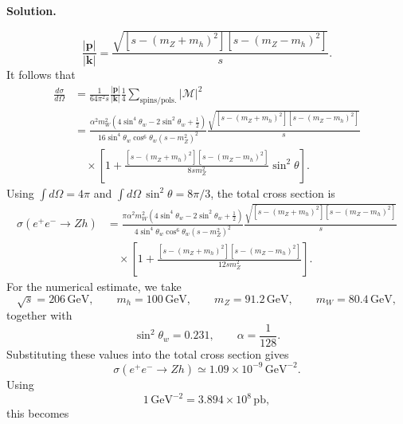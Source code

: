 \documentclass[a4paper,11pt]{article}
\newenvironment{solution}{\par\medskip\noindent\textbf{Solution.}\par\smallskip}{\par\medskip}
\begin{document}
\begin{solution}
\begin{equation}
    \frac{|\mathbf{p}|}{|\mathbf{k}|}
    =\frac{\sqrt{\left[s-(m_Z+m_h)^2\right]
    \left[s-(m_Z-m_h)^2\right]}}{s}.
\end{equation}
It follows that
\begin{equation}
\begin{aligned}
    \frac{d\sigma}{d\Omega}
    &=\frac{1}{64\pi^2s}\frac{|\mathbf{p}|}{|\mathbf{k}|}
    \frac{1}{4}\sum_{\mathrm{spins/pols.}}|\mathcal{M}|^2\\
    &=\frac{\alpha^2m_W^2
    \left(4\sin^4\theta_w-2\sin^2\theta_w+\frac{1}{2}\right)}
    {16\sin^4\theta_w\cos^6\theta_w(s-m_Z^2)^2}
    \frac{\sqrt{\left[s-(m_Z+m_h)^2\right]
    \left[s-(m_Z-m_h)^2\right]}}{s}\\
    &\quad\times\left[1+
    \frac{\left[s-(m_Z+m_h)^2\right]\left[s-(m_Z-m_h)^2\right]}
    {8sm_Z^2}\sin^2\theta\right].
\end{aligned}
\end{equation}
Using $\int d\Omega=4\pi$ and
$\int d\Omega\,\sin^2\theta=8\pi/3$, the total cross section is
\begin{equation}
\begin{aligned}
    \sigma(e^+e^-\to Zh)
    &=\frac{\pi\alpha^2m_W^2
    \left(4\sin^4\theta_w-2\sin^2\theta_w+\frac{1}{2}\right)}
    {4\sin^4\theta_w\cos^6\theta_w(s-m_Z^2)^2}
    \frac{\sqrt{\left[s-(m_Z+m_h)^2\right]
    \left[s-(m_Z-m_h)^2\right]}}{s}\\
    &\quad\times\left[1+
    \frac{\left[s-(m_Z+m_h)^2\right]\left[s-(m_Z-m_h)^2\right]}
    {12sm_Z^2}\right].
\end{aligned}
\end{equation}
For the numerical estimate, we take
\begin{equation}
    \sqrt{s}=206\,\mathrm{GeV},\qquad
    m_h=100\,\mathrm{GeV},\qquad
    m_Z=91.2\,\mathrm{GeV},\qquad
    m_W=80.4\,\mathrm{GeV},
\end{equation}
together with
\begin{equation}
    \sin^2\theta_w=0.231,
    \qquad
    \alpha=\frac{1}{128}.
\end{equation}
Substituting these values into the total cross section gives
\begin{equation}
    \sigma(e^+e^-\to Zh)
    \simeq 1.09\times10^{-9}\,\mathrm{GeV}^{-2}.
\end{equation}
Using
\begin{equation}
    1\,\mathrm{GeV}^{-2}
    =3.894\times10^8\,\mathrm{pb},
\end{equation}
this becomes
\begin{equation}

\end{equation}
\end{solution}
\end{document}
